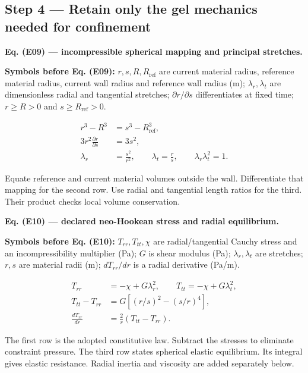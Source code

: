\documentclass[11pt]{article}
\begin{document}
\subsection*{Step 4 — Retain only the gel mechanics needed for confinement}

\textbf{Eq. (E09) — incompressible spherical mapping and principal stretches.}


\textbf{Symbols before Eq. (E09):} \(r,s,R,R_{\mathrm{ref}}\) are current material radius, reference material radius, current wall radius and reference wall radius (m); \(\lambda_r,\lambda_t\) are dimensionless radial and tangential stretches; \(\partial r/\partial s\) differentiates at fixed time; \(r\ge R>0\) and \(s\ge R_{\mathrm{ref}}>0\).



\begin{equation*}
\begin{aligned}
r^3-R^3&=s^3-R_{\mathrm{ref}}^3,\\
3r^2\frac{\partial r}{\partial s}&=3s^2,\\
\lambda_r&=\frac{s^2}{r^2},\qquad\lambda_t=\frac rs,\qquad
\lambda_r\lambda_t^2=1.
\end{aligned}
\end{equation*}

Equate reference and current material volumes outside the wall. Differentiate that mapping for the second row. Use radial and tangential length ratios for the third. Their product checks local volume conservation.


\textbf{Eq. (E10) — declared neo-Hookean stress and radial equilibrium.}


\textbf{Symbols before Eq. (E10):} \(T_{rr},T_{tt},\chi\) are radial/tangential Cauchy stress and an incompressibility multiplier (Pa); \(G\) is shear modulus (Pa); \(\lambda_r,\lambda_t\) are stretches; \(r,s\) are material radii (m); \(dT_{rr}/dr\) is a radial derivative (Pa/m).



\begin{equation*}
\begin{aligned}
T_{rr}&=-\chi+G\lambda_r^2,\qquad T_{tt}=-\chi+G\lambda_t^2,\\
T_{tt}-T_{rr}&=G[(r/s)^2-(s/r)^4],\\
\frac{dT_{rr}}{dr}&=\frac2r(T_{tt}-T_{rr}).
\end{aligned}
\end{equation*}

The first row is the adopted constitutive law. Subtract the stresses to eliminate constraint pressure. The third row states spherical elastic equilibrium. Its integral gives elastic resistance. Radial inertia and viscosity are added separately below.
\end{document}
